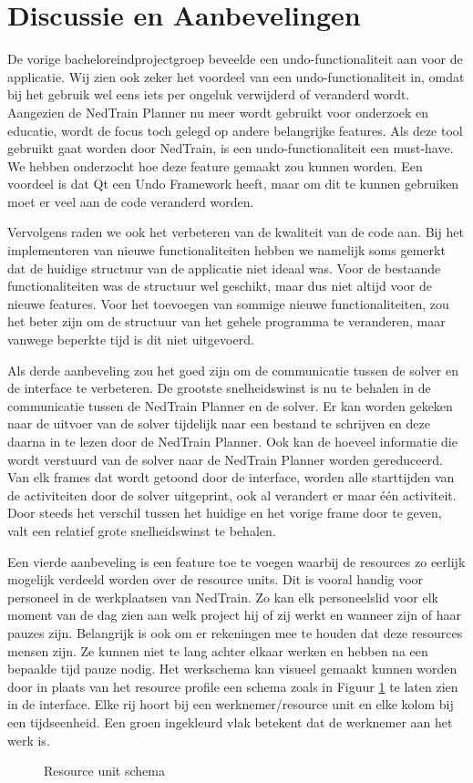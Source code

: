 \section{Discussie en Aanbevelingen}
De vorige bacheloreindprojectgroep beveelde een undo-functionaliteit aan \cite{bep2012nedtrain} voor de applicatie. Wij zien ook zeker het voordeel van een undo-functionaliteit in, omdat bij het gebruik wel eens iets per ongeluk verwijderd of veranderd wordt. Aangezien de NedTrain Planner nu meer wordt gebruikt voor onderzoek en educatie, wordt de focus toch gelegd op andere belangrijke features. Als deze tool gebruikt gaat worden door NedTrain, is een undo-functionaliteit een must-have. We hebben onderzocht hoe deze feature gemaakt zou kunnen worden. Een voordeel is dat Qt een Undo Framework heeft, maar om dit te kunnen gebruiken moet er veel aan de code veranderd worden. 

Vervolgens raden we ook het verbeteren van de kwaliteit van de code aan. Bij het implementeren van nieuwe functionaliteiten hebben we namelijk soms gemerkt dat de huidige structuur van de applicatie niet ideaal was. Voor de bestaande functionaliteiten was de structuur wel geschikt, maar dus niet altijd voor de nieuwe features. Voor het toevoegen van sommige nieuwe functionaliteiten, zou het beter zijn om de structuur van het gehele programma te veranderen, maar vanwege beperkte tijd is dit niet uitgevoerd.

Als derde aanbeveling zou het goed zijn om de communicatie tussen de solver en de interface te verbeteren. De grootste snelheidswinst is nu te behalen in de communicatie tussen de NedTrain Planner en de solver. Er kan worden gekeken naar de uitvoer van de solver tijdelijk naar een bestand te schrijven en deze daarna in te lezen door de NedTrain Planner. Ook kan de hoeveel informatie die wordt verstuurd van de solver naar de NedTrain Planner worden gereduceerd. Van elk frames dat wordt getoond door de interface, worden alle starttijden van de activiteiten door de solver uitgeprint, ook al verandert er maar \'e\'en activiteit. Door steeds het verschil tussen het huidige en het vorige frame door te geven, valt een relatief grote snelheidswinst te behalen.

Een vierde aanbeveling is een feature toe te voegen waarbij de resources zo eerlijk mogelijk verdeeld worden over de resource units. Dit is vooral handig voor personeel in de werkplaatsen van NedTrain. Zo kan elk personeelslid voor elk moment van de dag zien aan welk project hij of zij werkt en wanneer zijn of haar pauzes zijn. Belangrijk is ook om er rekeningen mee te houden dat deze resources mensen zijn. Ze kunnen niet te lang achter elkaar werken en hebben na een bepaalde tijd pauze nodig. Het werkschema kan visueel gemaakt kunnen worden door in plaats van het resource profile een schema zoals in Figuur \ref{fig:schema} te laten zien in de interface. Elke rij hoort bij een werknemer/resource unit en elke kolom bij een tijdseenheid. Een groen ingekleurd vlak betekent dat de werknemer aan het werk is.

\begin{figure}[H]
\centering

\caption{Resource unit schema}
\label{fig:schema}
\end{figure}
